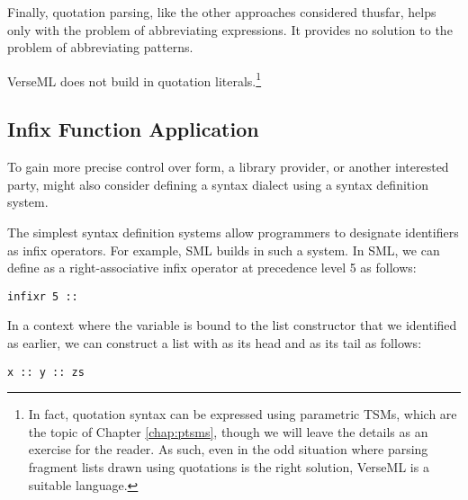 Finally, quotation parsing, like the other approaches considered thusfar, helps only with the problem of abbreviating expressions. It provides no solution to the problem of abbreviating patterns.%

VerseML does not build in quotation literals.\footnote{In fact, quotation syntax can be expressed using parametric TSMs, which are the topic of Chapter \ref{chap:ptsms}, though we will leave the details as an exercise for the reader. As such, even in the odd situation where parsing fragment lists drawn using quotations is the right solution, VerseML is a suitable language.}


\subsection{Infix Function Application}
To gain more precise control over form, a library provider, or another interested party, might also consider defining a syntax dialect using a syntax definition system.

The simplest syntax definition systems allow programmers to designate identifiers as infix operators. For example, SML builds in such a system. In SML, we can define \li{::} as a right-associative infix operator at precedence level 5 as follows:
\begin{lstlisting}[numbers=none]
infixr 5 ::
\end{lstlisting}
In a context where the variable  is bound to the list constructor that we identified as  earlier, we can construct a list with  as its head and  as its tail as follows:
\begin{lstlisting}[numbers=none]
x :: y :: zs
\end{lstlisting}


